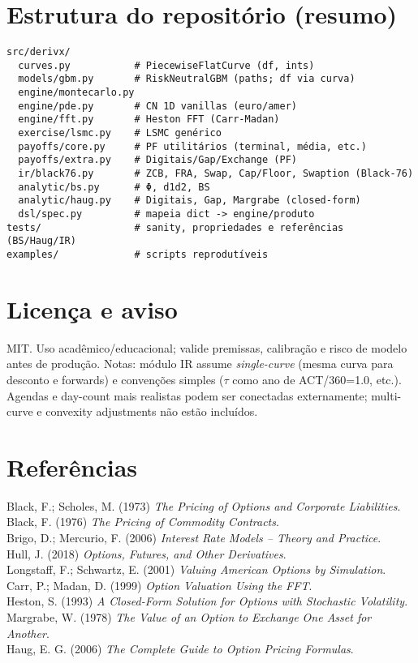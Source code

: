 \documentclass[11pt,a4paper]{article}
\begin{document}
\section{Estrutura do repositório (resumo)}
\begin{verbatim}
src/derivx/
  curves.py           # PiecewiseFlatCurve (df, ints)
  models/gbm.py       # RiskNeutralGBM (paths; df via curva)
  engine/montecarlo.py
  engine/pde.py       # CN 1D vanillas (euro/amer)
  engine/fft.py       # Heston FFT (Carr-Madan)
  exercise/lsmc.py    # LSMC genérico
  payoffs/core.py     # PF utilitários (terminal, média, etc.)
  payoffs/extra.py    # Digitais/Gap/Exchange (PF)
  ir/black76.py       # ZCB, FRA, Swap, Cap/Floor, Swaption (Black-76)
  analytic/bs.py      # Φ, d1d2, BS
  analytic/haug.py    # Digitais, Gap, Margrabe (closed-form)
  dsl/spec.py         # mapeia dict -> engine/produto
tests/                # sanity, propriedades e referências (BS/Haug/IR)
examples/             # scripts reprodutíveis
\end{verbatim}

\section{Licença e aviso}
MIT. Uso acadêmico/educacional; valide premissas, calibração e risco de modelo antes de produção.
Notas: módulo IR assume \emph{single-curve} (mesma curva para desconto e forwards) e convenções simples ($\tau$ como ano de ACT/360=1.0, etc.).
Agendas e day-count mais realistas podem ser conectadas externamente; multi-curve e convexity adjustments não estão incluídos.

\section*{Referências}
\noindent
Black, F.; Scholes, M. (1973) \emph{The Pricing of Options and Corporate Liabilities}.\\
Black, F. (1976) \emph{The Pricing of Commodity Contracts}.\\
Brigo, D.; Mercurio, F. (2006) \emph{Interest Rate Models -- Theory and Practice}.\\
Hull, J. (2018) \emph{Options, Futures, and Other Derivatives}.\\
Longstaff, F.; Schwartz, E. (2001) \emph{Valuing American Options by Simulation}.\\
Carr, P.; Madan, D. (1999) \emph{Option Valuation Using the FFT}.\\
Heston, S. (1993) \emph{A Closed-Form Solution for Options with Stochastic Volatility}.\\
Margrabe, W. (1978) \emph{The Value of an Option to Exchange One Asset for Another}.\\
Haug, E. G. (2006) \emph{The Complete Guide to Option Pricing Formulas}.
\end{document}
